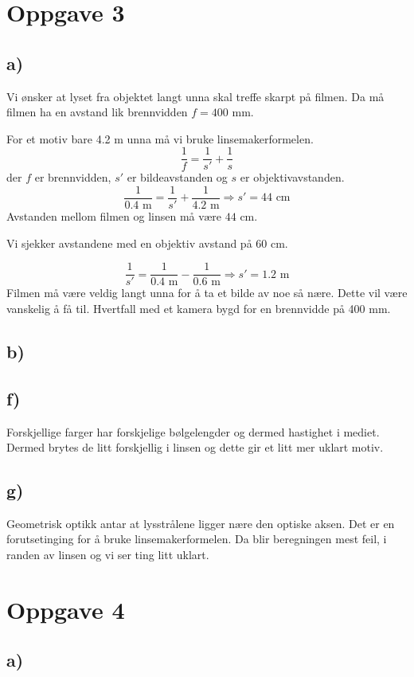 \documentclass{article}
\begin{document}
    
\section*{Oppgave 3}
  \subsection*{a)}
    Vi ønsker at lyset fra objektet langt unna skal treffe skarpt på filmen. Da må filmen ha en avstand lik brennvidden $f = 400$ mm. 
    
    For et motiv bare 4.2 m unna må vi bruke linsemakerformelen. 
    \[
    \frac{1}{f} = \frac{1}{s'} + \frac{1}{s}
    \]
    der $f$ er brennvidden, $s'$ er bildeavstanden og $s$ er objektivavstanden. 
    \[
    \frac{1}{0.4 \text{ m}} = \frac{1}{s'} + \frac{1}{4.2 \text{ m}} ⇒ s' = 44 \text{ cm}
    \]
    Avstanden mellom filmen og linsen må være $44$ cm. 
    
    Vi sjekker avstandene med en objektiv avstand på 60 cm. 
    
    \[
    \frac{1}{s'} = \frac{1}{0.4 \text{ m}} - \frac{1}{0.6 \text{ m}} ⇒ s' = 1.2 \text{ m}
    \]
    Filmen må være veldig langt unna for å ta et bilde av noe så nære. Dette vil være vanskelig å få til. Hvertfall med et kamera bygd for en brennvidde på 400 mm.
    
  \subsection*{b)}
  
  
  \subsection*{f)}
    Forskjellige farger har forskjelige bølgelengder og dermed hastighet i mediet. Dermed brytes de litt forskjellig i linsen og dette gir et litt mer uklart motiv. 
    
  \subsection*{g)}
    Geometrisk optikk antar at lysstrålene ligger nære den optiske aksen. Det er en forutsetinging for å bruke linsemakerformelen. Da blir beregningen mest feil, i randen av linsen og vi ser ting litt uklart. 
    
    

\section*{Oppgave 4}
  \subsection*{a)}
    
    
    
\end{document}
